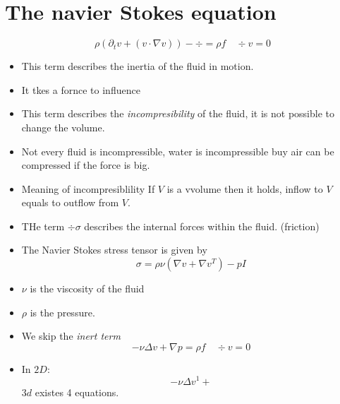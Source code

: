 \documentclass[openany,a4paper,11pt]{memoir}
\theoremstyle{definition}
\begin{document}
\section{The navier Stokes equation}

\[ \rho(\partial_t v+ (v\cdot \nabla v))-\div=\rho f\quad \div v=0 \]

\begin{itemize}
\item This term describes the inertia of the fluid in motion.
  
\item It tkes a fornce to influence
\end{itemize}


\begin{itemize}
\item This term describes the \textit{incompresibility} of the fluid, it is not possible to change the volume.
  
\item Not every fluid is incompressible, water is incompressible buy air can be compressed if the force is big.
  
\item Meaning of incompresiblility
  If $V$ is a vvolume then it holds, inflow to $V$ equals to outflow from $V$.
\end{itemize}

\begin{itemize}
\item THe term $\div \sigma$ describes the internal forces within the fluid. (friction)
  
\item The Navier Stokes stress tensor is given by \[ \sigma=\rho\nu(\nabla v+\nabla v^T)-p I\]%
  
\item $\nu$ is the viscosity of the fluid
  
\item $\rho$ is the pressure.
\end{itemize}

\begin{itemize}
\item We skip the \textit{inert term}
  \[ -\nu\Delta v + \nabla p = \rho f\quad \div v=0\]%
\item In $2D$: \[ -\nu\Delta v^1+\] $3d$ existes 4 equations.
\end{itemize}
\end{document}
